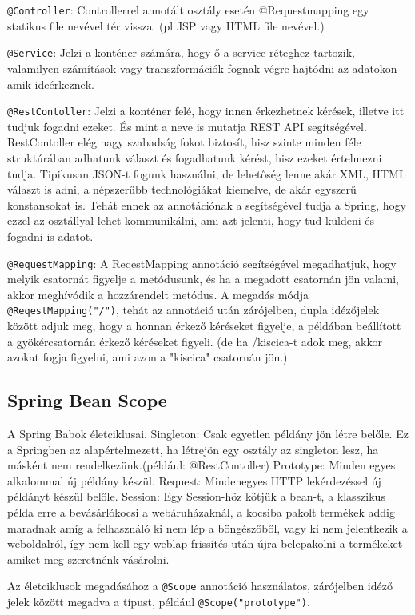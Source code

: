 \texttt{@Controller}: Controllerrel annotált osztály esetén @Requestmapping egy statikus file nevével tér vissza. (pl JSP vagy HTML file nevével.)

\texttt{@Service}: Jelzi a konténer számára, hogy ő a service réteghez tartozik, valamilyen számítások vagy transzformációk fognak végre hajtódni az adatokon amik ideérkeznek.

\texttt{@RestContoller}:
Jelzi a konténer felé, hogy innen érkezhetnek kérések, illetve itt tudjuk fogadni ezeket. És mint a neve is mutatja REST API segítségével. RestContoller elég nagy szabadság fokot biztosít, hisz szinte minden féle struktúrában adhatunk választ és fogadhatunk kérést, hisz ezeket értelmezni tudja. Tipikusan JSON-t fogunk használni, de lehetőség lenne akár XML, HTML választ is adni, a népszerűbb technológiákat kiemelve, de akár egyszerű konstansokat is. Tehát ennek az annotációnak a segítségével tudja a Spring, hogy ezzel az osztállyal lehet kommunikálni, ami azt jelenti, hogy tud küldeni és fogadni is adatot.

\texttt{@RequestMapping}:
A ReqestMapping annotáció segítségével megadhatjuk, hogy melyik csatornát figyelje a metódusunk, és ha a megadott csatornán jön valami, akkor meghívódik a hozzárendelt metódus.  A megadás módja \texttt{@ReqestMapping("/")}, tehát az annotáció után zárójelben, dupla idézőjelek között adjuk meg, hogy a honnan érkező kéréseket figyelje, a példában beállított a gyökércsatornán érkező kéréseket figyeli. (de ha /kiscica-t adok meg, akkor azokat fogja figyelni, ami azon a "kiscica" csatornán jön.)

\subsection{Spring Bean Scope}

A Spring Babok életciklusai.
Singleton: Csak egyetlen példány jön létre belőle. Ez a Springben az alapértelmezett, ha létrejön egy osztály az singleton lesz, ha másként nem rendelkezünk.(például: @RestContoller)
Prototype: Minden egyes alkalommal új példány készül.
Request: Mindenegyes HTTP lekérdezéssel új példányt készül belőle.
Session: Egy Session-höz kötjük a bean-t, a klasszikus példa erre a bevásárlókocsi a webáruházaknál, a kocsiba pakolt termékek addig maradnak amíg a felhasználó ki nem lép a böngészőből, vagy ki nem jelentkezik a weboldalról, így nem kell egy weblap frissítés után újra belepakolni a termékeket amiket meg szeretnénk vásárolni.

Az életciklusok megadásához a \texttt{@Scope} annotáció használatos, zárójelben idéző jelek között megadva a típust, például \texttt{@Scope("prototype")}.

